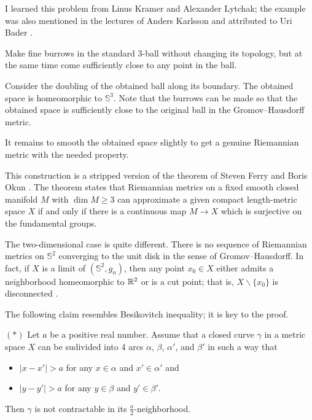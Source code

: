 I learned this problem from Linus Kramer and Alexander Lytchak;
the example was also mentioned in the lectures of Anders Karlsson
and attributed to Uri Bader \cite[see 2.3 in][]{karlsson}.





Make fine burrows in the standard 3-ball without changing its topology,
but at the same time come sufficiently close to any point in the ball.

Consider the doubling of the obtained ball along  its boundary.
The obtained space is homeomorphic to $\mathbb{S}^3$.
Note that the burrows can be made 
so that the obtained space is sufficiently close to the original ball 
in the Gromov--Hausdorff metric.

It remains to smooth the obtained space slightly 
to get a genuine Riemannian metric with the needed property.\qeds


This construction is a stripped version of the theorem of Steven Ferry and Boris Okun \cite{ferry-okun}.
The theorem states that Riemannian metrics on a fixed smooth closed manifold $M$ with $\dim M\ge 3$ 
can approximate a given compact length-metric space $X$ 
if and only if 
there is a continuous map $M\to X$ which is surjective on the fundamental groups. 

The two-dimensional case is quite different.
There is no sequence of Riemannian metrics on
$\mathbb{S}^2$ converging to the unit disk in the sense of Gromov--Hausdorff.
In fact, 
if $X$ is a limit of $(\mathbb{S}^2,g_n)$,
then any point $x_0\in X$ either admits a neighborhood homeomorphic to $\mathbb{R}^2$ or is a cut point;
that is, $X\backslash\{x_0\}$ is disconnected \cite[see 3.32 in][]{gromov-MetStr}.

The following claim resembles Besikovitch inequality;
it is key to the proof.
\begin{cl}{$({*})$} Let $a$ be a positive real number.
 Assume that a closed curve $\gamma$ in a metric space $X$ can be sudivided into 4 arcs $\alpha$, $\beta$, $\alpha'$, and $\beta'$ in such a way that 
 \begin{itemize}
 \item $|x-x'|>a$ for any $x\in\alpha$ and $x'\in \alpha'$
 and
 \item $|y-y'|>a$ for any $y\in\beta$ and $y'\in \beta'$.
 \end{itemize}
 Then $\gamma$ is not contractable in its $\tfrac a2$-neighborhood.
\end{cl}


